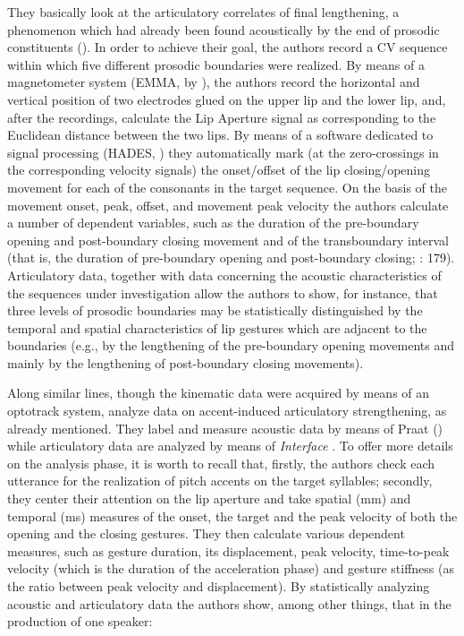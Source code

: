 \documentclass[output=paper]{langsci/langscibook}
\begin{document}
They basically look at the articulatory correlates of final lengthening, a phenomenon which had already been found acoustically by the end of prosodic constituents (\citealt{Oller1973,Wightman1992}). In order to achieve their goal, the authors record a CV sequence within which five different prosodic boundaries were realized. By means of a magnetometer system (EMMA, by \citealt{Perkell1992}), the authors record the horizontal and vertical position of two electrodes glued on the upper lip and the lower lip, and, after the recordings, calculate the Lip Aperture signal as corresponding to the Euclidean distance between the two lips. By means of a software dedicated to signal processing (HADES, \citealt{Rubin1995}) they automatically mark (at the zero-crossings in the corresponding velocity signals) the onset\slash offset of the lip closing\slash opening movement for each of the consonants in the target sequence. On the basis of the movement onset, peak, offset, and movement peak velocity the authors calculate a number of dependent variables, such as the duration of the pre-boundary opening and post-boundary closing movement and of the transboundary interval (that is, the duration of pre-boundary opening and post-boundary closing; \citealt{Byrd1998}: 179). Articulatory data, together with data concerning the acoustic characteristics of the sequences under investigation allow the authors to show, for instance, that three levels of prosodic boundaries may be statistically distinguished by the temporal and spatial characteristics of lip gestures which are adjacent to the boundaries (e.g., by the lengthening of the pre-boundary opening movements and mainly by the lengthening of post-boundary closing movements). 

Along similar lines, though the kinematic data were acquired by means of an optotrack system, \citet{Avesani2007,Avesani2009} analyze data on accent-induced articulatory strengthening, as already mentioned. They label and measure acoustic data by means of Praat (\citealt{Boersma.praat}) while articulatory data are analyzed by means of \textit{Interface} \citep{Tisato2005}. To offer more details on the analysis phase, it is worth to recall that, firstly, the authors check each utterance for the realization of pitch accents on the target syllables; secondly, they center their attention on the lip aperture and take spatial (mm) and temporal (ms) measures of the onset, the target and the peak velocity of both the opening and the closing gestures. They then calculate various dependent measures, such as gesture duration, its displacement, peak velocity, time-to-peak velocity (which is the duration of the acceleration phase) and gesture stiffness (as the ratio between peak velocity and displacement). By statistically analyzing acoustic and articulatory data the authors show, among other things, that in the production of one speaker:
\end{document}
